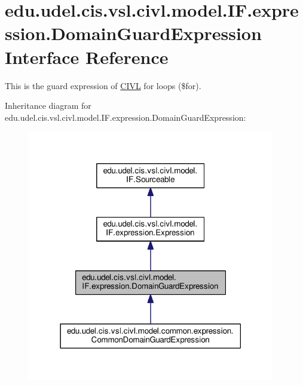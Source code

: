 \hypertarget{interfaceedu_1_1udel_1_1cis_1_1vsl_1_1civl_1_1model_1_1IF_1_1expression_1_1DomainGuardExpression}{}\section{edu.\+udel.\+cis.\+vsl.\+civl.\+model.\+I\+F.\+expression.\+Domain\+Guard\+Expression Interface Reference}
\label{interfaceedu_1_1udel_1_1cis_1_1vsl_1_1civl_1_1model_1_1IF_1_1expression_1_1DomainGuardExpression}


This is the guard expression of \hyperlink{classedu_1_1udel_1_1cis_1_1vsl_1_1civl_1_1CIVL}{C\+I\+V\+L} for loops ({\ttfamily \$for}).  




Inheritance diagram for edu.\+udel.\+cis.\+vsl.\+civl.\+model.\+I\+F.\+expression.\+Domain\+Guard\+Expression\+:
\nopagebreak
\begin{figure}[H]
\begin{center}
\leavevmode
\includegraphics[width=306pt]{interfaceedu_1_1udel_1_1cis_1_1vsl_1_1civl_1_1model_1_1IF_1_1expression_1_1DomainGuardExpression__inherit__graph}
\end{center}
\end{figure}


